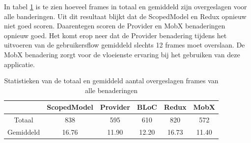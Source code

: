 In tabel \ref{table:experiment-skipped-frames} is te zien hoeveel frames in totaal en gemiddeld zijn overgeslagen voor alle banderingen. \newline \newline
Uit dit resultaat blijkt dat de ScopedModel en Redux opnieuw niet goed scoren. Daarentegen scoren de Provider en MobX benaderingen opnieuw goed. Het komt erop neer dat de Provider benadering tijdens het uitvoeren van de gebruikersflow gemiddeld slechts 12 frames moet overslaan. De MobX benadering zorgt voor de vloeienste ervaring bij het gebruiken van deze applicatie.

\begin{table}[H]
    \centering
    \begin{tabular}{c|c|c|c|c|c}
        & \textbf{ScopedModel} & \textbf{Provider} & \textbf{BLoC} & \textbf{Redux} & \textbf{MobX} \\ \hline
        Totaal      &  838   &  595     &  610     &  820    &  572        \\ \hline
        Gemiddeld   &  16.76    &  11.90   &  12.20   &  16.73  &  11.40        \\ 
    \end{tabular}
    \caption{Statistieken van de totaal en gemiddeld aantal overgeslagen frames van alle benaderingen}
    \label{table:experiment-skipped-frames}
\end{table}

